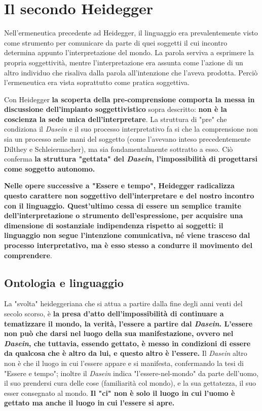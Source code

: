 \section{Il secondo Heidegger}

Nell'ermeneutica precedente ad Heidegger, il linguaggio era
prevalentemente visto come strumento per
comunicare da parte di quei soggetti il cui incontro
determina appunto l'interpretazione del mondo. La
parola serviva a esprimere la propria soggettività, mentre
l'interpretazione era assunta come l'azione di un altro
individuo che risaliva dalla parola all'intenzione che
l'aveva prodotta. Perciò l'ermeneutica era vista soprattutto
come pratica soggettiva.

Con Heidegger \textbf{la scoperta della pre-comprensione comporta
la messa in discussione dell'impianto soggettivistico}
sopra descritto: \textbf{non è la coscienza la sede unica dell'interpretare}. La struttura di "pre" che condiziona
il \textit{Dasein} e il suo processo interpretativo fa si che
la comprensione non sia un processo nelle mani del
soggetto (come l'avevano inteso precedentemente Dilthey e
Schleiermacher), ma sia fondamentalmente sottratto a
esso. Ciò conferma \textbf{la struttura "gettata" del
\textit{Dasein}, l'impossibilità di progettarsi come soggetto
autonomo.}

\textbf{Nelle opere successive a "Essere e tempo",
Heidegger radicalizza questo carattere non
soggettivo dell'interpretare e del nostro incontro
con il linguaggio. Quest'ultimo cessa di essere
un semplice tramite dell'interpretazione o strumento
dell'espressione, per acquisire una dimensione di
sostanziale indipendenza rispetto ai soggetti: il linguaggio
non segue l'intenzione comunicativa, né viene
trasceso dal processo interpretativo, ma è esso stesso a
condurre il movimento del comprendere}.

\subsection{Ontologia e linguaggio}

La "svolta" heideggeriana che si attua a partire
dalla fine degli anni venti del secolo scorso, è \textbf{la
presa d'atto dell'impossibilità di continuare a
tematizzare il mondo, la verità, l'essere a partire
dal \textit{Dasein}. L'essere non può che darsi nel luogo della
sua manifestazione, ovvero nel \textit{Dasein}, che tuttavia,
essendo gettato, è messo in condizioni di essere da
qualcosa che è altro da lui, e questo altro è l'essere.}
Il \textit{Dasein} altro non è che il luogo in cui l'essere appare
e si manifesta, confermando la tesi di "Essere e tempo";
inoltre il \textit{Dasein} indica "l'essere-nel-mondo" da parte
dell'uomo, il suo prendersi cura delle cose (familiarità
col mondo), e la sua gettatezza, il suo esser consegnato
al mondo. \textbf{Il "ci" non è solo il luogo in cui
l'uomo è gettato ma anche il luogo in cui l'essere si apre.}

